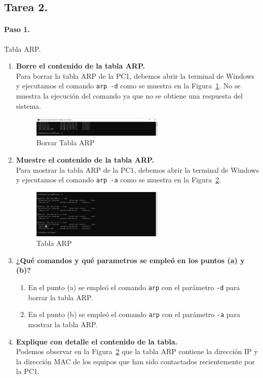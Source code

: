     \subsection{Tarea 2.}
        \paragraph{Paso 1.}
        Tabla ARP.
        \begin{enumerate}
            \item \textbf{Borre el contenido de la tabla ARP.}\\
            Para borrar la tabla ARP de la PC1, debemos abrir la terminal de Windows y ejecutamos el comando \texttt{arp -d} como se muestra en la Figura~\ref{fig:borrar_arp}. No se muestra la ejecución del comando ya que no se obtiene una respuesta del sistema.
            \begin{figure}[H]
                \centering
                \includegraphics[width=0.6\textwidth]{img/borrar_tabla_ARP.PNG}
                \caption{Borrar Tabla ARP}
                \label{fig:borrar_arp}
            \end{figure}
            \item \textbf{Muestre el contenido de la tabla ARP.}\\
            Para mostrar la tabla ARP de la PC1, debemos abrir la terminal de Windows y ejecutamos el comando \texttt{arp -a} como se muestra en la Figura~\ref{fig:tabla_arp}.
            \begin{figure}[H]
                \centering
                \includegraphics[width=0.6\textwidth]{img/tabla_ARP.PNG}
                \caption{Tabla ARP}
                \label{fig:tabla_arp}
            \end{figure}
            \item \textbf{¿Qué comandos y qué parametros se empleó en los puntos (a) y (b)?}
            \begin{enumerate}
                \item En el punto (a) se empleó el comando \texttt{arp} con el parámetro \texttt{-d} para borrar la tabla ARP. 
                \item En el punto (b) se empleó el comando \texttt{arp} con el parámetro \texttt{-a} para mostrar la tabla ARP.
            \end{enumerate}
            \item \textbf{Explique con detalle el contenido de la tabla.}\\
            Podemos observar en la Figura~\ref{fig:tabla_arp} que la tabla ARP contiene la dirección IP y la dirección MAC de los equipos que han sido contactados recientemente por la PC1.
        \end{enumerate}

